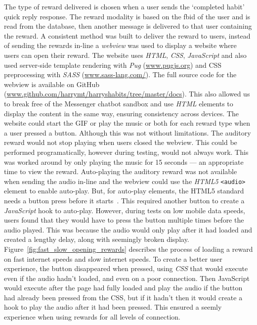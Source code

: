 The type of reward delivered is chosen when a user sends the `completed habit' quick reply response. The reward modality is based on the fbid of the user and is read from the database, then another message is delivered to that user containing the reward. A consistent method was built to deliver the reward to users, instead of sending the rewards in-line a \textit{webview} was used to display a website where users can open their reward. The website uses \textit{HTML}, \textit{CSS}, \textit{JavaScript} and also used server-side template rendering with \textit{Pug} (\url{www.pugjs.org}) and CSS preprocessing with \textit{SASS} (\url{www.sass-lang.com/}). The full source code for the webview is available on GitHub (\url{www.github.com/harrymt/harryshabits/tree/master/docs}). This also allowed us to break free of the Messenger chatbot sandbox and use \textit{HTML} elements to display the content in the same way, ensuring consistency across devices. The website could start the GIF or play the music or both for each reward type when a user pressed a button. Although this was not without limitations. The auditory reward would not stop playing when users closed the webview. This could be performed programatically, however during testing, would not always work. This was worked around by only playing the music for 15 seconds --- an appropriate time to view the reward. Auto-playing the auditory reward was not available when sending the audio in-line and the webview could use the \textit{HTML5} \verb|<audio>| element to enable auto-play.
But, for auto-play elements, the HTML5 standard needs a button press before it starts~\cite{mozilla_autoplay}.
This required another button to create a \textit{JavaScript} hook to auto-play.
However, during tests on low mobile data speeds, users found that they would have to press the button multiple times before the audio played.
This was because the audio would only play after it had loaded and created a lengthy delay, along with seemingly broken display.
Figure~\ref{fig:fast_slow_opening_rewards} describes the process of loading a reward on fast internet speeds and slow internet speeds. To create a better user experience, the button disappeared when pressed, using \textit{CSS} that would execute even if the audio hadn't loaded, and even on a poor connection.
Then JavaScript would execute after the page had fully loaded and play the audio if the button had already been pressed from the CSS, but if it hadn't then it would create a hook to play the audio after it had been pressed.
This ensured a seemly experience when using rewards for all levels of connection.

